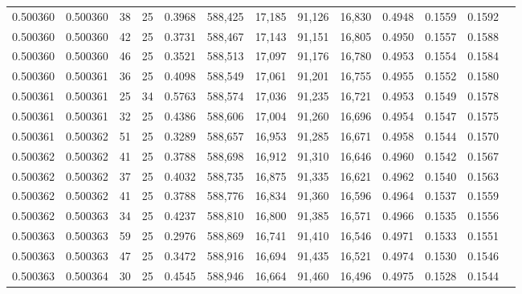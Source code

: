 \begin{tabular}{rrrrrrrrrrrrr}
0.500360 & 0.500360 &    38 &  25 &                                     0.3968 & 588,425 &  17,185 &  91,126 &  16,830 & 0.4948 & 0.1559 & 0.1592 \\
0.500360 & 0.500360 &    42 &  25 &                                     0.3731 & 588,467 &  17,143 &  91,151 &  16,805 & 0.4950 & 0.1557 & 0.1588 \\
0.500360 & 0.500360 &    46 &  25 &                                     0.3521 & 588,513 &  17,097 &  91,176 &  16,780 & 0.4953 & 0.1554 & 0.1584 \\
0.500360 & 0.500361 &    36 &  25 &                                     0.4098 & 588,549 &  17,061 &  91,201 &  16,755 & 0.4955 & 0.1552 & 0.1580 \\
0.500361 & 0.500361 &    25 &  34 &                                     0.5763 & 588,574 &  17,036 &  91,235 &  16,721 & 0.4953 & 0.1549 & 0.1578 \\
0.500361 & 0.500361 &    32 &  25 &                                     0.4386 & 588,606 &  17,004 &  91,260 &  16,696 & 0.4954 & 0.1547 & 0.1575 \\
0.500361 & 0.500362 &    51 &  25 &                                     0.3289 & 588,657 &  16,953 &  91,285 &  16,671 & 0.4958 & 0.1544 & 0.1570 \\
0.500362 & 0.500362 &    41 &  25 &                                     0.3788 & 588,698 &  16,912 &  91,310 &  16,646 & 0.4960 & 0.1542 & 0.1567 \\
0.500362 & 0.500362 &    37 &  25 &                                     0.4032 & 588,735 &  16,875 &  91,335 &  16,621 & 0.4962 & 0.1540 & 0.1563 \\
0.500362 & 0.500362 &    41 &  25 &                                     0.3788 & 588,776 &  16,834 &  91,360 &  16,596 & 0.4964 & 0.1537 & 0.1559 \\
0.500362 & 0.500363 &    34 &  25 &                                     0.4237 & 588,810 &  16,800 &  91,385 &  16,571 & 0.4966 & 0.1535 & 0.1556 \\
0.500363 & 0.500363 &    59 &  25 &                                     0.2976 & 588,869 &  16,741 &  91,410 &  16,546 & 0.4971 & 0.1533 & 0.1551 \\
0.500363 & 0.500363 &    47 &  25 &                                     0.3472 & 588,916 &  16,694 &  91,435 &  16,521 & 0.4974 & 0.1530 & 0.1546 \\
0.500363 & 0.500364 &    30 &  25 &                                     0.4545 & 588,946 &  16,664 &  91,460 &  16,496 & 0.4975 & 0.1528 & 0.1544 \\

\end{tabular}

